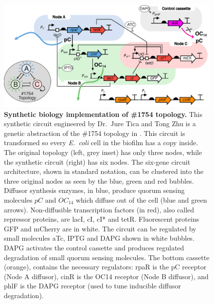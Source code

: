 \begin{figure}[H]
    \centering
    \includegraphics[width=1\textwidth]{chapters/Chapter 2/synthetic circuit2}
    \caption{\textbf{Synthetic biology implementation of \#1754 topology.} This synthetic circuit
    engineered by Dr.~Jure Tica and Tong Zhu is a genetic abstraction of the \#1754 topology in \cite{Scholes2019}.
    This circuit is transformed so every \textit{E.~coli} cell in the biofilm has a copy inside.
    The original topology (left, grey inset) has only three nodes, while the synthetic circuit (right) has six nodes.
    The six-gene circuit architecture, shown in standard notation, can be clustered into the three original nodes
    as seen by the blue, green and red bubbles.
    Diffusor synthesis enzymes, in blue, produce quorum sensing molecules $pC$ and $OC_{14}$ which diffuse out of the cell (blue and green arrows).
    Non-diffusible transcription
    factors (in red), also called repressor proteins, are lacI, cI, cI* and tetR.
    Fluorescent proteins GFP and mCherry are in white.
    The circuit can be regulated by small molecules aTc, IPTG and DAPG shown in white bubbles.
    DAPG activates the control cassette and produces regulated degradation of small quorum sensing molecules.
    The bottom cassette (orange), contains the necessary regulators:
    rpaR is the pC receptor (Node A diffusor), cinR is the OC14 receptor (Node B diffusor),
        and phlF is the DAPG receptor (used to tune inducible diffusor degradation).}
    \label{fig:synthetic circuit_chapter2}
\end{figure}

